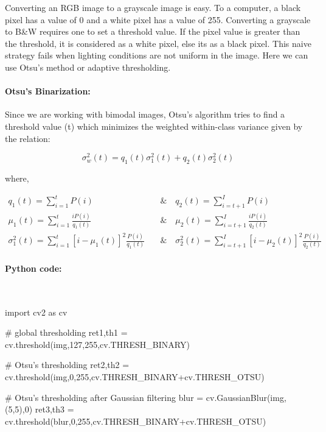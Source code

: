 \documentclass[12pt]{article}
\theoremstyle{mytheoremstyle}
\theoremstyle{mytheoremstyle}
\theoremstyle{myproblemstyle}
\begin{document}
      Converting an RGB image to a grayscale image is easy. 
      To a computer, a black pixel has a value of 0 and a white pixel has a value of 255. Converting a grayscale to B\&W requires one to set a threshold value. If the pixel value is greater than the threshold, it is considered as a white pixel, else its as a black pixel. This naive strategy fails when lighting conditions are not uniform in the image. Here we can use Otsu's method or adaptive thresholding.
      
      \paragraph{Otsu's Binarization:}
      Since we are working with bimodal images, Otsu's algorithm tries to find a threshold value (t) which minimizes the weighted within-class variance given by the relation:
      
      \begin{equation*}
        \sigma_w^2(t) = q_1(t)\sigma_1^2(t)+q_2(t)\sigma_2^2(t)
      \end{equation*}
      
      where,
      
      \begin{align*}
        q_1(t) = \sum_{i=1}^{t} P(i) \quad &\& \quad q_2(t) = \sum_{i=t+1}^{I} P(i)
        \\
        \mu_1(t) = \sum_{i=1}^{t} \frac{iP(i)}{q_1(t)} \quad &\& \quad \mu_2(t) = \sum_{i=t+1}^{I} \frac{iP(i)}{q_2(t)}
        \\
        \sigma_1^2(t) = \sum_{i=1}^{t} [i-\mu_1(t)]^2 \frac{P(i)}{q_1(t)} \quad &\& \quad \sigma_2^2(t) = \sum_{i=t+1}^{I} [i-\mu_2(t)]^2 \frac{P(i)}{q_2(t)}
      \end{align*}
      
      \paragraph{Python code:} \
      \begin{python}
        import cv2 as cv

        # global thresholding
        ret1,th1 = cv.threshold(img,127,255,cv.THRESH_BINARY)

        # Otsu's thresholding
        ret2,th2 = cv.threshold(img,0,255,cv.THRESH_BINARY+cv.THRESH_OTSU)

        # Otsu's thresholding after Gaussian filtering
        blur = cv.GaussianBlur(img,(5,5),0)
        ret3,th3 = cv.threshold(blur,0,255,cv.THRESH_BINARY+cv.THRESH_OTSU)
      \end{python}
        
      
\end{document}
